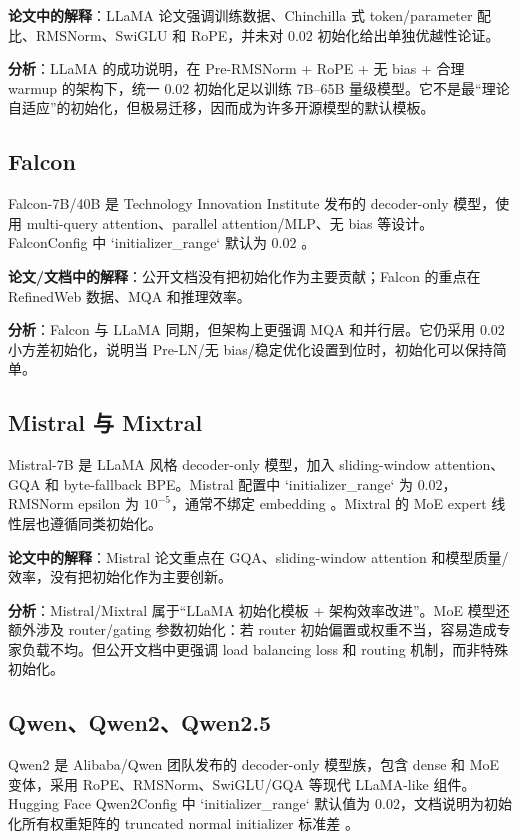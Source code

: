 \documentclass[UTF8,a4paper,11pt]{ctexart}
\begin{document}
\textbf{论文中的解释}：LLaMA 论文强调训练数据、Chinchilla 式 token/parameter 配比、RMSNorm、SwiGLU 和 RoPE，并未对 $0.02$ 初始化给出单独优越性论证。

\textbf{分析}：LLaMA 的成功说明，在 Pre-RMSNorm + RoPE + 无 bias + 合理 warmup 的架构下，统一 $0.02$ 初始化足以训练 7B--65B 量级模型。它不是最“理论自适应”的初始化，但极易迁移，因而成为许多开源模型的默认模板。

\subsection{Falcon}

Falcon-7B/40B 是 Technology Innovation Institute 发布的 decoder-only 模型，使用 multi-query attention、parallel attention/MLP、无 bias 等设计。FalconConfig 中 `initializer\_range` 默认为 $0.02$ \cite{falcondocs}。

\textbf{论文/文档中的解释}：公开文档没有把初始化作为主要贡献；Falcon 的重点在 RefinedWeb 数据、MQA 和推理效率。

\textbf{分析}：Falcon 与 LLaMA 同期，但架构上更强调 MQA 和并行层。它仍采用 $0.02$ 小方差初始化，说明当 Pre-LN/无 bias/稳定优化设置到位时，初始化可以保持简单。

\subsection{Mistral 与 Mixtral}

Mistral-7B 是 LLaMA 风格 decoder-only 模型，加入 sliding-window attention、GQA 和 byte-fallback BPE。Mistral 配置中 `initializer\_range` 为 $0.02$，RMSNorm epsilon 为 $10^{-5}$，通常不绑定 embedding \cite{mistraldocs,mistralpaper}。Mixtral 的 MoE expert 线性层也遵循同类初始化。

\textbf{论文中的解释}：Mistral 论文重点在 GQA、sliding-window attention 和模型质量/效率，没有把初始化作为主要创新。

\textbf{分析}：Mistral/Mixtral 属于“LLaMA 初始化模板 + 架构效率改进”。MoE 模型还额外涉及 router/gating 参数初始化：若 router 初始偏置或权重不当，容易造成专家负载不均。但公开文档中更强调 load balancing loss 和 routing 机制，而非特殊初始化。

\subsection{Qwen、Qwen2、Qwen2.5}

Qwen2 是 Alibaba/Qwen 团队发布的 decoder-only 模型族，包含 dense 和 MoE 变体，采用 RoPE、RMSNorm、SwiGLU/GQA 等现代 LLaMA-like 组件。Hugging Face Qwen2Config 中 `initializer\_range` 默认值为 $0.02$，文档说明为初始化所有权重矩阵的 truncated normal initializer 标准差 \cite{qwen2docs}。
\end{document}
